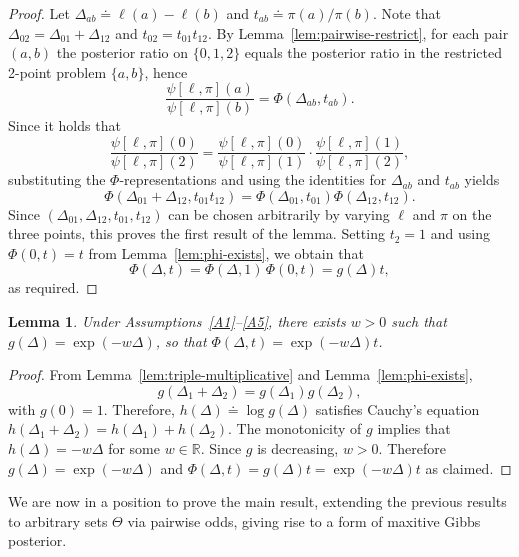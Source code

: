 \documentclass[accepted]{uai2026} %
\newtheorem{lemma}{Lemma}
\theoremstyle{remark}
\begin{document}
\begin{proof}
Let $\Delta_{ab} \doteq \ell(a) - \ell(b)$ and $t_{ab} \doteq \pi(a)/\pi(b)$. Note that $\Delta_{02} = \Delta_{01} + \Delta_{12}$ and $t_{02}=t_{01}t_{12}$. By Lemma~\ref{lem:pairwise-restrict}, for each pair $(a,b)$ the posterior ratio on $\{0,1,2\}$ equals the posterior ratio in the restricted 2-point problem $\{a,b\}$, hence
\[
\frac{\psi[\ell,\pi](a)}{\psi[\ell,\pi](b)} = \Phi(\Delta_{ab},t_{ab}).
\]
Since it holds that
\[
\frac{\psi[\ell,\pi](0)}{\psi[\ell,\pi](2)}
=
\frac{\psi[\ell,\pi](0)}{\psi[\ell,\pi](1)} \cdot \frac{\psi[\ell,\pi](1)}{\psi[\ell,\pi](2)},
\]
substituting the $\Phi$-representations and using the identities for $\Delta_{ab}$ and $t_{ab}$ yields
\[
\Phi(\Delta_{01}+\Delta_{12}, t_{01}t_{12}) = \Phi(\Delta_{01},t_{01}) \Phi(\Delta_{12},t_{12}).
\]
Since $(\Delta_{01},\Delta_{12},t_{01},t_{12})$ can be chosen arbitrarily by varying $\ell$ and $\pi$ on the three points, this proves the first result of the lemma. Setting $t_2 = 1$ and using $\Phi(0,t) = t$ from Lemma~\ref{lem:phi-exists}, we obtain that
\[
\Phi(\Delta,t) = \Phi(\Delta,1)\,\Phi(0,t) = g(\Delta)t,
\]
as required.
\end{proof}


\begin{lemma}
\label{lem:exponential}
Under Assumptions~\ref{A1}--\ref{A5}, there exists $w > 0$ such that
$g(\Delta)=\exp(-w\Delta)$, so that $\Phi(\Delta,t) = \exp(-w\Delta) t$.
\end{lemma}

\begin{proof}
From Lemma~\ref{lem:triple-multiplicative} and Lemma~\ref{lem:phi-exists},
\[
g(\Delta_1 + \Delta_2) = g(\Delta_1) g(\Delta_2),
\]
with $g(0)=1$. Therefore, $h(\Delta) \doteq \log g(\Delta)$ satisfies Cauchy's equation $h(\Delta_1+\Delta_2) = h(\Delta_1)+h(\Delta_2)$.
The monotonicity of $g$ implies that $h(\Delta) = -w\Delta$ for some $w \in \mathbb{R}$. Since $g$ is decreasing, $w > 0$. Therefore $g(\Delta) = \exp(-w\Delta)$ and $\Phi(\Delta,t) = g(\Delta)t = \exp(-w\Delta)t$ as claimed.
\end{proof}

We are now in a position to prove the main result, extending the previous results to arbitrary sets $\Theta$ via pairwise odds, giving rise to a form of maxitive Gibbs posterior.
\end{document}
